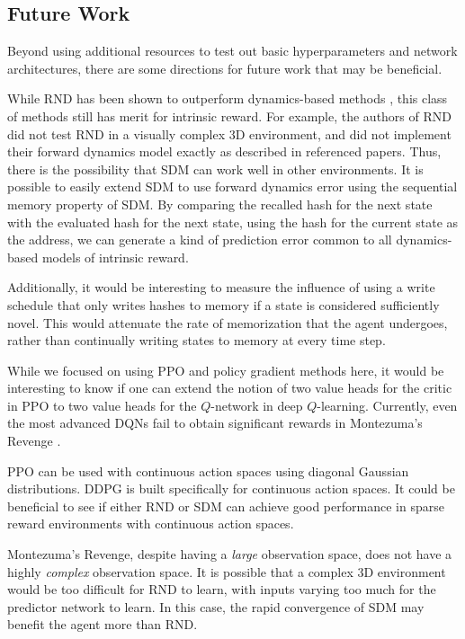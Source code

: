 \documentclass[journal, onecolumn, 12pt, draftclsnofoot]{IEEEtran}
\begin{document}
	\subsection{Future Work}
	\par Beyond using additional resources to test out basic hyperparameters and network architectures, there are some directions for future work that may be beneficial.
	\par While RND has been shown to outperform dynamics-based methods \cite{rnd}, this class of methods still has merit for intrinsic reward. For example, the authors of RND did not test RND in a visually complex 3D environment, and did not implement their forward dynamics model exactly as described in referenced papers. Thus, there is the possibility that SDM can work well in other environments. It is possible to easily extend SDM to use forward dynamics error using the sequential memory property of SDM. By comparing the recalled hash for the next state with the evaluated hash for the next state, using the hash for the current state as the address, we can generate a kind of prediction error common to all dynamics-based models of intrinsic reward.
	\par Additionally, it would be interesting to measure the influence of using a write schedule that only writes hashes to memory if a state is considered sufficiently novel. This would attenuate the rate of memorization that the agent undergoes, rather than continually writing states to memory at every time step.
	\par While we focused on using PPO and policy gradient methods here, it would be interesting to know if one can extend the notion of two value heads for the critic in PPO to two value heads for the $Q$-network in deep $Q$-learning. Currently, even the most advanced DQNs fail to obtain significant rewards in Montezuma's Revenge \cite{rainbow}.
	\par PPO can be used with continuous action spaces using diagonal Gaussian distributions. DDPG is built specifically for continuous action spaces. It could be beneficial to see if either RND or SDM can achieve good performance in sparse reward environments with continuous action spaces.
	\par Montezuma's Revenge, despite having a \textit{large} observation space, does not have a highly \textit{complex} observation space. It is possible that a complex 3D environment would be too difficult for RND to learn, with inputs varying too much for the predictor network to learn. In this case, the rapid convergence of SDM may  benefit the agent more than RND.
\end{document}
